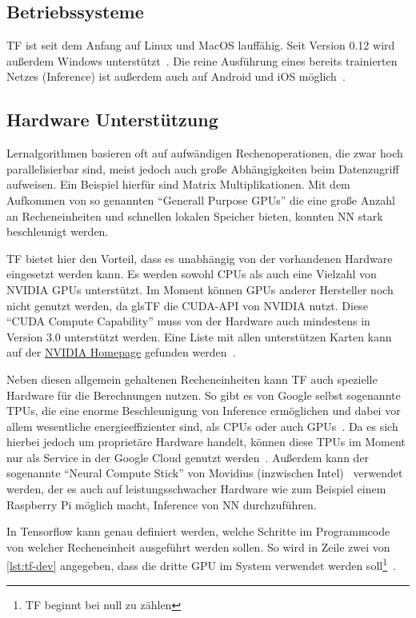 \subsection{Betriebssysteme}
\gls{TF} ist seit dem Anfang auf Linux und MacOS lauffähig. Seit Version 0.12 wird außerdem Windows unterstützt~\cite{tf0.12}. Die reine Ausführung eines bereits trainierten Netzes (Inference) ist außerdem auch auf Android und iOS möglich~\cite{tensorflow2015-whitepaper}\cite{tensorflow2016-whitepaper}.

\subsection{Hardware Unterstützung}
Lernalgorithmen basieren oft auf aufwändigen Rechenoperationen, die zwar hoch parallelisierbar sind, meist jedoch auch große Abhängigkeiten beim Datenzugriff aufweisen. Ein Beispiel hierfür sind Matrix Multiplikationen. Mit dem Aufkommen von so genannten "`Generall Purpose GPUs"' die eine große Anzahl an Recheneinheiten und schnellen lokalen Speicher bieten, konnten \gls{NN} stark beschleunigt werden.

\gls{TF} bietet hier den Vorteil, dass es unabhängig von der vorhandenen Hardware eingesetzt werden kann. Es werden sowohl CPUs als auch eine Vielzahl von NVIDIA GPUs unterstützt. Im Moment können GPUs anderer Hersteller noch nicht genutzt werden, da gls{TF} die CUDA-API von NVIDIA nutzt. Diese "`CUDA Compute Capability"' muss von der Hardware auch mindestens in Version 3.0 unterstützt werden. Eine Liste mit allen unterstützen Karten kann auf der \href{https://developer.nvidia.com/cuda-gpus}{NVIDIA Homepage} gefunden werden~\cite{tfinstall}.

Neben diesen allgemein gehaltenen Recheneinheiten kann \gls{TF} auch spezielle Hardware für die Berechnungen nutzen. So gibt es von Google selbst sogenannte \glspl{TPU}, die eine enorme Beschleunigung von Inference ermöglichen und dabei vor allem wesentliche energieeffizienter sind, als CPUs oder auch GPUs~\cite{TPU}. Da es sich hierbei jedoch um proprietäre Hardware handelt, können diese \glspl{TPU} im Moment nur als Service in der Google Cloud genutzt werden~\cite{TPU2}. Außerdem kann der sogenannte "`Neural Compute Stick"' von Movidius (inzwischen Intel)~\cite{movidius} verwendet werden, der es auch auf leistungsschwacher Hardware wie zum Beispiel einem Raspberry Pi möglich macht, Inference von \gls{NN} durchzuführen.

In Tensorflow kann genau definiert werden, welche Schritte im Programmcode von welcher Recheneinheit ausgeführt werden sollen. So wird in Zeile zwei von \autoref{lst:tf-dev} angegeben, dass die dritte GPU im System verwendet werden soll\footnote{\gls{TF} beginnt bei null zu zählen}~\cite{tf-dev}.

